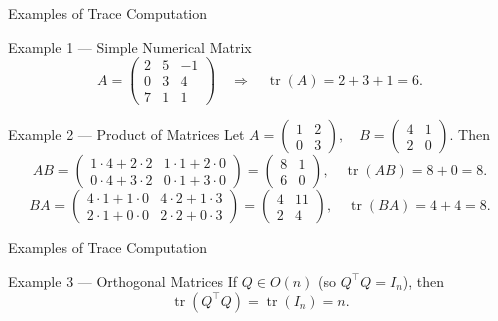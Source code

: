 \documentclass[aspectratio=169]{beamer}
\begin{document}
\begin{frame}{Examples of Trace Computation}

\begin{exampleblock}{Example 1 — Simple Numerical Matrix}
\[
A =
\begin{pmatrix}
2 & 5 & -1\\
0 & 3 & 4\\
7 & 1 & 1
\end{pmatrix}
\quad\Longrightarrow\quad
\operatorname{tr}(A) = 2 + 3 + 1 = 6.
\]
\end{exampleblock}

\pause

\begin{exampleblock}{Example 2 — Product of Matrices}
Let
$
A =
\begin{pmatrix}
1 & 2\\
0 & 3
\end{pmatrix},
\quad
B =
\begin{pmatrix}
4 & 1\\
2 & 0
\end{pmatrix}.
$
Then
\[
AB =
\begin{pmatrix}
1\cdot4 + 2\cdot2 & 1\cdot1 + 2\cdot0\\
0\cdot4 + 3\cdot2 & 0\cdot1 + 3\cdot0
\end{pmatrix}
=
\begin{pmatrix}
8 & 1\\
6 & 0
\end{pmatrix},
\quad
\operatorname{tr}(AB)=8+0=8.
\]
\[
BA =
\begin{pmatrix}
4\cdot1 + 1\cdot0 & 4\cdot2 + 1\cdot3\\
2\cdot1 + 0\cdot0 & 2\cdot2 + 0\cdot3
\end{pmatrix}
=
\begin{pmatrix}
4 & 11\\
2 & 4
\end{pmatrix},
\quad
\operatorname{tr}(BA)=4+4=8.
\]
\end{exampleblock}
\end{frame}

\begin{frame}{Examples of Trace Computation}

\begin{exampleblock}{Example 3 — Orthogonal Matrices}
If $Q \in O(n)$ (so $Q^\top Q = I_n$), then
\[
\operatorname{tr}(Q^\top Q) = \operatorname{tr}(I_n) = n.
\]
\end{exampleblock}

\end{frame}
\end{document}
